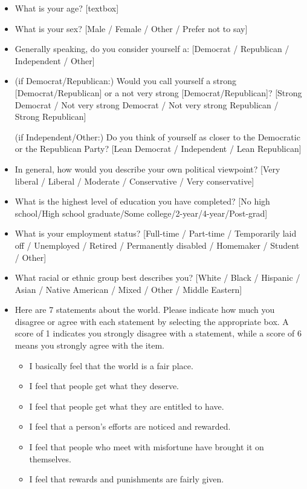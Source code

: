\begin{itemize}
    \item What is your age? [textbox]
    \item What is your sex? [Male / Female / Other / Prefer not to say]
    \item Generally speaking, do you consider yourself a: [Democrat / Republican / Independent / Other]
    \item (if Democrat/Republican:) Would you call yourself a strong [Democrat/Republican] or
    a not very strong [Democrat/Republican]? [Strong Democrat / Not very strong
    Democrat / Not very strong Republican / Strong Republican]

    (if Independent/Other:) Do you think of yourself as closer to the
    Democratic or the Republican Party? [Lean Democrat / Independent / Lean
    Republican]
    \item In general, how would you describe your own political viewpoint?
    [Very liberal / Liberal / Moderate / Conservative / Very conservative]
    \item What is the highest level of education you have completed? [No high
    school/High school graduate/Some college/2-year/4-year/Post-grad] 
    \item What
    is your employment status? [Full-time / Part-time / Temporarily laid off /
    Unemployed / Retired / Permanently disabled / Homemaker / Student / Other]
    \item What racial or ethnic group best describes you?
    [White / Black / Hispanic / Asian / Native American / Mixed / Other / Middle Eastern]
    \item Here are 7 statements about the world. Please indicate how much you
    disagree or agree with each statement by selecting the appropriate box. A
    score of 1 indicates you strongly disagree with a statement, while a score
    of 6 means you strongly agree with the item.   
    \begin{itemize}
	\item I basically feel that the world is a fair place.
	\item I feel that people get what they deserve.
	\item I feel that people get what they are entitled to have.
	\item I feel that a person's efforts are noticed and rewarded.
	\item I feel that people who meet with misfortune have brought it on themselves.
	\item I feel that rewards and punishments are fairly given.

\end{itemize}
\end{itemize}
